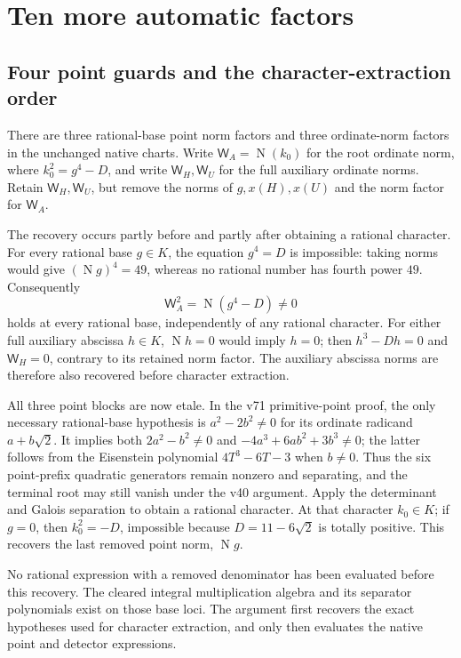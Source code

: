 \documentclass[11pt,a4paper]{article}
\newcommand{\N}{\operatorname{N}}
\begin{document}
\section{Ten more automatic factors}
\subsection{Four point guards and the character-extraction order}
There are three rational-base point norm factors and three ordinate-norm
factors in the unchanged native charts. Write $\mathsf W_A=\N(k_0)$
for the root ordinate norm, where $k_0^2=g^4-D$, and write
$\mathsf W_H,\mathsf W_U$ for the full auxiliary ordinate norms.
Retain $\mathsf W_H,\mathsf W_U$, but remove the norms of
$g,x(H),x(U)$ and the norm factor for $\mathsf W_A$.

The recovery occurs partly before and partly after obtaining a rational
character. For every rational base $g\in K$, the equation $g^4=D$
is impossible: taking norms would give $(\N g)^4=49$, whereas no rational
number has fourth power $49$. Consequently
\[
 \mathsf W_A^2=\N(g^4-D)\ne0
\]
holds at every rational base, independently of any rational character.
For either full auxiliary abscissa $h\in K$, $\N h=0$ would imply $h=0$;
then $h^3-Dh=0$ and $\mathsf W_H=0$, contrary to its retained norm
factor. The auxiliary abscissa norms are therefore also recovered before
character extraction.

All three point blocks are now etale. In the v71 primitive-point proof,
the only necessary rational-base hypothesis is $a^2-2b^2\ne0$ for its
ordinate radicand $a+b\sqrt2$. It implies both $2a^2-b^2\ne0$ and
$-4a^3+6ab^2+3b^3\ne0$; the latter follows from the Eisenstein polynomial
$4T^3-6T-3$ when $b\ne0$. Thus the six point-prefix quadratic generators
remain nonzero and separating, and the terminal root may still vanish
under the v40 argument. Apply the determinant and Galois separation to
obtain a rational character. At that character $k_0\in K$; if $g=0$,
then $k_0^2=-D$, impossible because $D=11-6\sqrt2$ is totally positive.
This recovers the last removed point norm, $\N g$.

No rational expression with a removed denominator has been evaluated
before this recovery. The cleared integral multiplication algebra and
its separator polynomials exist on those base loci. The argument first
recovers the exact hypotheses used for character extraction, and only
then evaluates the native point and detector expressions.
\end{document}
